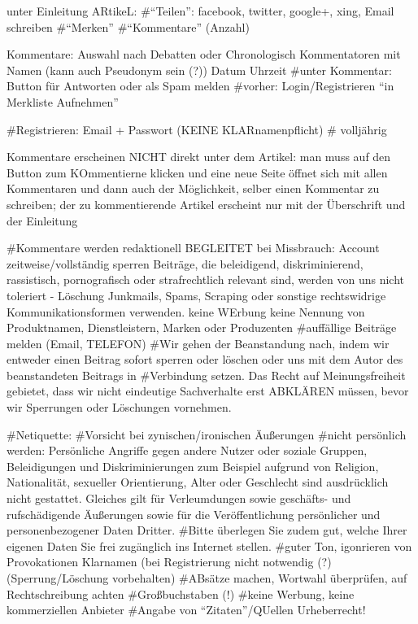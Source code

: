 unter Einleitung ARtikeL: 
	#``Teilen'': facebook, twitter, google+, xing, Email schreiben
	#``Merken''
	#``Kommentare'' (Anzahl)
	
Kommentare: Auswahl nach Debatten oder Chronologisch
	Kommentatoren mit Namen (kann auch Pseudonym sein (?)) Datum Uhrzeit
	#unter Kommentar: Button für Antworten oder als Spam melden
	#vorher: Login/Registrieren
	``in Merkliste Aufnehmen''
	
#Registrieren: Email + Passwort (KEINE KLARnamenpflicht)
#	volljährig




Kommentare erscheinen NICHT direkt unter dem Artikel: man muss auf den Button zum KOmmentierne klicken und eine neue Seite öffnet sich mit allen Kommentaren und dann auch der Möglichkeit, selber einen Kommentar zu schreiben; der zu kommentierende Artikel erscheint nur mit der Überschrift und der Einleitung


#Kommentare werden redaktionell BEGLEITET
bei Missbrauch: Account zeitweise/vollständig sperren
Beiträge, die beleidigend, diskriminierend, rassistisch, pornografisch oder strafrechtlich relevant sind, werden von uns nicht toleriert - Löschung
Junkmails, Spams, Scraping oder sonstige rechtswidrige Kommunikationsformen verwenden. 
keine WErbung
keine Nennung von Produktnamen, Dienstleistern, Marken oder Produzenten 
#auffällige Beiträge melden (Email, TELEFON)
#Wir gehen der Beanstandung nach, indem wir entweder einen Beitrag sofort sperren oder löschen oder uns mit dem Autor des beanstandeten Beitrags in #Verbindung setzen. Das Recht auf Meinungsfreiheit gebietet, dass wir nicht eindeutige Sachverhalte erst ABKLÄREN müssen, bevor wir Sperrungen oder Löschungen vornehmen.

#Netiquette:
	#Vorsicht bei zynischen/ironischen Äußerungen
	#nicht persönlich werden: Persönliche Angriffe gegen andere Nutzer oder soziale Gruppen, Beleidigungen und Diskriminierungen zum Beispiel aufgrund von Religion, Nationalität, sexueller Orientierung, Alter oder Geschlecht sind ausdrücklich nicht gestattet. Gleiches gilt für Verleumdungen sowie geschäfts- und rufschädigende Äußerungen sowie für die Veröffentlichung persönlicher und personenbezogener Daten Dritter. #Bitte überlegen Sie zudem gut, welche Ihrer eigenen Daten Sie frei zugänglich ins Internet stellen.
	#guter Ton, igonrieren von Provokationen
	Klarnamen (bei Registrierung nicht notwendig (?) (Sperrung/Löschung vorbehalten)
	#ABsätze machen, Wortwahl überprüfen, auf Rechtschreibung achten
	#Großbuchstaben (!)
	#keine Werbung, keine kommerziellen Anbieter
	#Angabe von ``Zitaten''/QUellen
	Urheberrecht!
	
